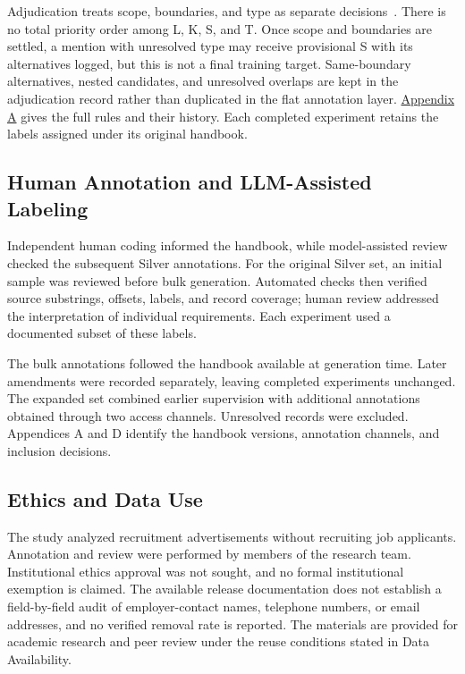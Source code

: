 Adjudication treats scope, boundaries, and type as separate decisions~\citep{artstein2008agreement}. There is no total priority order among L, K, S, and T. Once scope and boundaries are settled, a mention with unresolved type may receive provisional S with its alternatives logged, but this is not a final training target. Same-boundary alternatives, nested candidates, and unresolved overlaps are kept in the adjudication record rather than duplicated in the flat annotation layer. \hyperref[app:a]{Appendix A} gives the full rules and their history. Each completed experiment retains the labels assigned under its original handbook.



\subsection{Human Annotation and LLM-Assisted Labeling}
\label{sec:annotation-workflow-r36}

Independent human coding informed the handbook, while model-assisted review checked the subsequent Silver annotations. For the original Silver set, an initial sample was reviewed before bulk generation. Automated checks then verified source substrings, offsets, labels, and record coverage; human review addressed the interpretation of individual requirements. Each experiment used a documented subset of these labels.

The bulk annotations followed the handbook available at generation time. Later amendments were recorded separately, leaving completed experiments unchanged. The expanded set combined earlier supervision with additional annotations obtained through two access channels. Unresolved records were excluded. Appendices A and D identify the handbook versions, annotation channels, and inclusion decisions.



\subsection{Ethics and Data Use}
The study analyzed recruitment advertisements without recruiting job applicants. Annotation and review were performed by members of the research team. Institutional ethics approval was not sought, and no formal institutional exemption is claimed. The available release documentation does not establish a field-by-field audit of employer-contact names, telephone numbers, or email addresses, and no verified removal rate is reported. The materials are provided for academic research and peer review under the reuse conditions stated in Data Availability.
